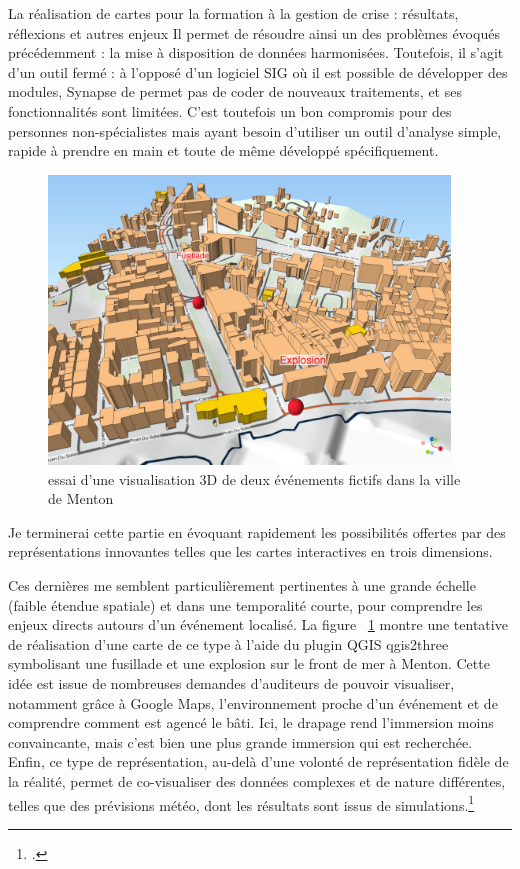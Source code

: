 \documentclass[10pt,a4paper]{report} %
\begin{document}
\begin{part}{La réalisation de cartes pour la formation à la gestion de crise : résultats, réflexions et autres enjeux}
Il permet de résoudre ainsi un des problèmes évoqués précédemment : la mise à disposition de données harmonisées. Toutefois, il s’agit d’un outil fermé : à l’opposé d’un logiciel SIG où il est possible de développer des modules, Synapse de permet pas de coder de nouveaux traitements, et ses fonctionnalités sont limitées. C’est toutefois un bon compromis pour des personnes non-spécialistes mais ayant besoin d’utiliser un outil d’analyse simple, rapide à prendre en main et toute de même développé spécifiquement.
\begin{figure}[!t]
    \centering
    \includegraphics[width=0.95\textwidth]{figures/Menton_local.png}
    \caption{essai d’une visualisation 3D de deux événements fictifs dans la ville de Menton}
    \label{fig17}
\end{figure}
Je terminerai cette partie en évoquant rapidement les possibilités offertes par des représentations innovantes telles que les cartes interactives en trois dimensions. 

Ces dernières me semblent particulièrement pertinentes à une grande échelle (faible étendue spatiale) et dans une temporalité courte, pour comprendre les enjeux directs autours d’un événement localisé. La figure ~\ref{fig17} montre une tentative de réalisation d’une carte de ce type à l’aide du plugin QGIS qgis2three symbolisant une fusillade et une explosion sur le front de mer à Menton. Cette idée est issue de nombreuses demandes d’auditeurs de pouvoir visualiser, notamment grâce à Google Maps, l’environnement proche d’un événement et de comprendre comment est agencé le bâti. Ici, le drapage rend l’immersion moins convaincante, mais c’est bien une plus grande immersion qui est recherchée. Enfin, ce type de représentation, au-delà d’une volonté de représentation fidèle de la réalité, permet de co-visualiser des données complexes et de nature différentes, telles que des prévisions météo, dont les résultats sont issus de simulations.\footcite[Voir les travaux de l'équipe GEOVIS de l'UMR LASTIG. Par exemple][ ]{perrinVisualAnalysisInconsistencies2021}


\end{part}
\end{document}
